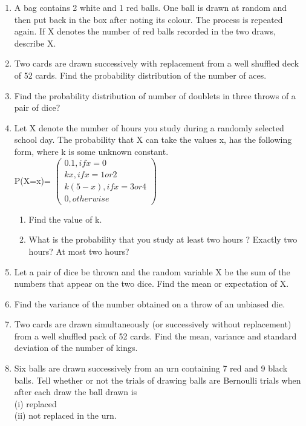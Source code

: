 \begin{enumerate}[label=\arabic*.,ref=\thesubsection.\theenumi]
\item A bag contains 2 white and 1 red balls. One ball is drawn at random and then put back in the box after noting its colour. The process is repeated again. If X denotes the number of red balls recorded in the two draws, describe X.\\

\item Two cards are drawn successively with replacement from a well shuffled deck of 52 cards. Find the probability distribution of the number of aces.\\

\item Find the probability distribution of number of doublets in three throws of a pair of dice?\\

\item Let X denote the number of hours you study during a randomly selected school day. The probability that X can take the values x, has the following form, where k is some unknown constant.\\
P(X=x)= $\begin{pmatrix} 0.1, if x= 0 \\ kx,if x= 1 or 2 \\ k(5-x), if x= 3 or 4 \\ 0, otherwise \end{pmatrix}$
\begin{enumerate}
\item  Find the value of k.
\item  What is the probability that you study at least two hours ? Exactly two hours? At
most two hours?
\end{enumerate}

\item Let a pair of dice be thrown and the random variable X be the sum of the numbers that appear on the two dice. Find the mean or expectation of X.\\

\item Find the variance of the number obtained on a throw of an unbiased die.\\

\item Two cards are drawn simultaneously (or successively without replacement) from a well shuffled pack of 52 cards. Find the mean, variance and standard deviation of the number of kings.\\

\item Six balls are drawn successively from an urn containing 7 red and 9 black balls. Tell whether or not the trials of drawing balls are Bernoulli trials when after each draw the ball drawn is\\
(i) replaced \\
(ii) not replaced in the urn.\\


\end{enumerate}
